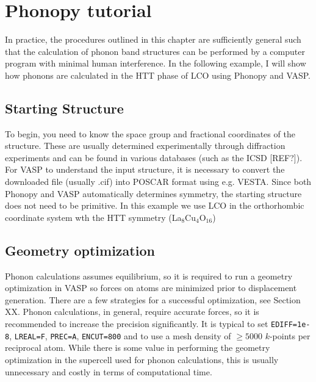 \lstset{basicstyle=\ttfamily\footnotesize, breaklines=true, frame=single}

\chapter{Phonopy tutorial}
In practice, the procedures outlined in this chapter are sufficiently general such that the calculation of phonon band structures can be performed by a computer program with minimal human interference. In the following example, I will show how phonons are calculated in the HTT phase of LCO using Phonopy and VASP.

\section{Starting Structure}
To begin, you need to know the space group and fractional coordinates of the structure. These are usually determined experimentally through diffraction experiments and can be found in various databases (such as the ICSD [REF?]). For VASP to understand the input structure, it is necessary to convert the downloaded file (usually .cif) into POSCAR format using e.g. VESTA. Since both Phonopy and VASP automatically determines symmetry, the starting structure does not need to be primitive. In this example we use LCO in the orthorhombic coordinate system wth the HTT symmetry (La$_8$Cu$_4$O$_{16}$)

\section{Geometry optimization}
Phonon calculations assumes equilibrium, so it is required to run a geometry optimization in VASP so forces on atoms are minimized prior to displacement generation. There are a few strategies for a successful optimization, see Section XX. Phonon calculations, in general, require accurate forces, so it is recommended to increase the precision significantly. It is typical to set \texttt{EDIFF=1e-8}, \texttt{LREAL=F}, \texttt{PREC=A}, \texttt{ENCUT=800} and to use a mesh density of $\geq 5000$ $k$-points per reciprocal atom. While there is some value in performing the geometry optimization in the supercell used for phonon calculations, this is usually unnecessary and costly in terms of computational time.

